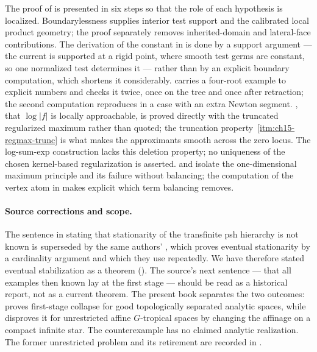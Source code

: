 The proof of  is presented in six steps so that
the role of each hypothesis is localized.  Boundarylessness supplies
interior test support and the calibrated local product geometry; the proof
separately removes inherited-domain and lateral-face contributions.  The derivation of the constant in
 is done by a support argument --- the current is
supported at a rigid point, where smooth test germs are constant,
so one normalized test determines it --- rather than
by an explicit boundary computation, which shortens it considerably.
 carries a four-root example to explicit numbers and
checks it twice, once on the tree and once after retraction; the second
computation reproduces  in a case with an extra
Newton segment.  , that $\log|f|$ is locally
approachable, is proved directly with the truncated regularized maximum
rather than quoted; the truncation property
\,\cref{itm:ch15-regmax-trunc} is what makes the
approximants smooth across the zero locus.  The log-sum-exp construction
lacks this deletion property; no uniqueness of the chosen kernel-based
regularization is asserted.   and
 isolate the one-dimensional maximum principle
and its failure without balancing; the computation of the vertex atom in
 makes explicit which term balancing removes.

\paragraph{Source corrections and scope.}
The sentence in \cite[Remark~8.1.6]{CLD25} stating that stationarity of the
transfinite psh hierarchy is not known is superseded by the same authors'
\cite[Lemma~8.1.4]{CLD25}, which proves eventual stationarity by a
cardinality argument and which they use repeatedly.  We have therefore stated
eventual stabilization as a theorem
().  The source's next sentence --- that
all examples then known lay at the first stage --- should be read as a
historical report, not as a current theorem.  The present book separates the
two outcomes:  proves
first-stage collapse for good topologically separated analytic spaces, while
 disproves it for unrestricted
affine $G$-tropical spaces by changing the affinage on a compact infinite
star.  The counterexample has no claimed analytic realization.  The former
unrestricted problem and its retirement are recorded in
.


